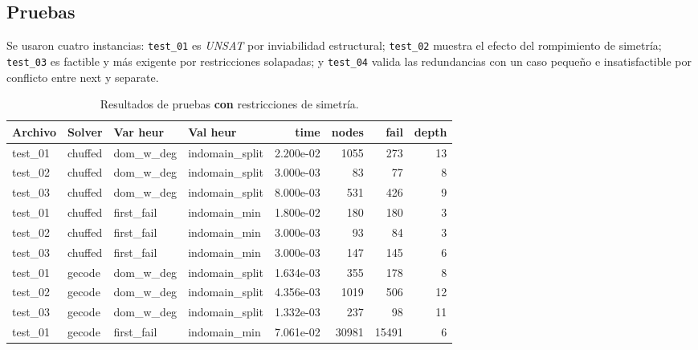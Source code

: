 
\subsection{Pruebas}\label{sec:05-reunion-pruebas}
Se usaron cuatro instancias: \texttt{test\_01} es \emph{UNSAT} por inviabilidad estructural; \texttt{test\_02} muestra el efecto del rompimiento de simetría; \texttt{test\_03} es factible y más exigente por restricciones solapadas; y \texttt{test\_04} valida las redundancias con un caso pequeño e insatisfactible por conflicto entre \textsf{next} y \textsf{separate}.


\begin{compactfloats}
  \begin{table}[H]
    \centering
    \small
    \setlength{\tabcolsep}{10.8pt}
    \caption{Resultados de pruebas \textbf{con} restricciones de simetría.}
    \label{tab:pruebas-reunion-on}
    \begin{tabular}{l l l l r r r r}
      \toprule
      \textbf{Archivo} & \textbf{Solver} & \textbf{Var heur} & \textbf{Val heur} & \textbf{time} & \textbf{nodes} & \textbf{fail} & \textbf{depth} \\
      \midrule
      test\_01 & chuffed & dom\_w\_deg  & indomain\_split & 2.200e-02 &  1055 &  273 & 13 \\
      test\_02 & chuffed & dom\_w\_deg  & indomain\_split & 3.000e-03 &    83 &   77 &  8 \\
      test\_03 & chuffed & dom\_w\_deg  & indomain\_split & 8.000e-03 &   531 &  426 &  9 \\
      \midrule
      test\_01 & chuffed & first\_fail  & indomain\_min   & 1.800e-02 &   180 &  180 &  3 \\
      test\_02 & chuffed & first\_fail  & indomain\_min   & 3.000e-03 &    93 &   84 &  3 \\
      test\_03 & chuffed & first\_fail  & indomain\_min   & 3.000e-03 &   147 &  145 &  6 \\
      \midrule
      test\_01 & gecode  & dom\_w\_deg  & indomain\_split & 1.634e-03 &   355 &  178 &  8 \\
      test\_02 & gecode  & dom\_w\_deg  & indomain\_split & 4.356e-03 &  1019 &  506 & 12 \\
      test\_03 & gecode  & dom\_w\_deg  & indomain\_split & 1.332e-03 &   237 &   98 & 11 \\
      \midrule
      test\_01 & gecode  & first\_fail  & indomain\_min   & 7.061e-02 & 30981 & 15491 &  6 \\

\end{tabular}
\end{table}
\end{compactfloats}
